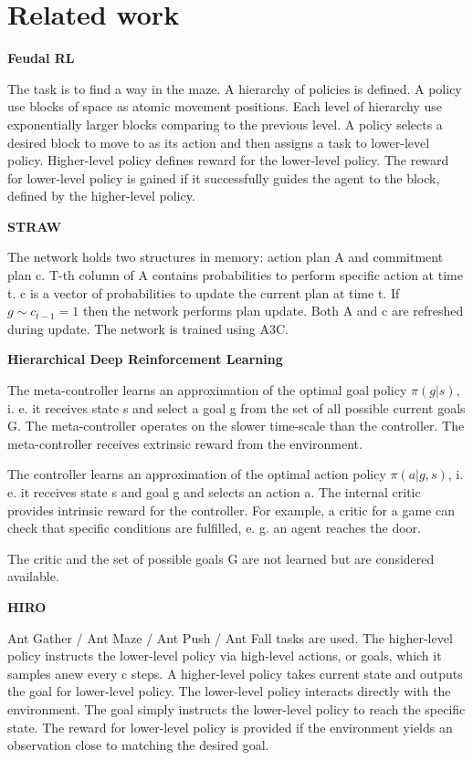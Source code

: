 \documentclass{article}
\begin{document}
\section{Related work}

\textbf{Feudal RL}~\citep{Dayan1992FeudalRL}

The task is to find a way in the maze. A hierarchy of policies is defined. A policy use blocks of space as atomic movement positions. Each level of hierarchy use exponentially larger blocks comparing to the previous level. A policy selects a desired block to move to as its action and then assigns a task to lower-level policy. Higher-level policy defines reward for the lower-level policy. The reward for lower-level policy is gained if it successfully guides the agent to the block, defined by the higher-level policy.

\textbf{STRAW}~\citep{Vezhnevets2016StrategicAW}

The network holds two structures in memory: action plan A and commitment plan c. T-th column of A contains probabilities to perform specific action at time t. c is a vector of probabilities to update the current plan at time t. If $g \sim c_{t-1} = 1$ then the network performs plan update. Both A and c are refreshed during update. The network is trained using A3C.

\textbf{Hierarchical Deep Reinforcement Learning}~\citep{Kulkarni2016HierarchicalDR}

The meta-controller learns an approximation of the optimal goal policy $\pi(g|s)$, i. e. it receives state s and select a goal g from the set of all possible current goals G. The meta-controller operates on the slower time-scale than the controller. The meta-controller receives extrinsic reward from the environment.

The controller learns an approximation of the optimal action policy $\pi(a|g,s)$, i. e. it receives state s and goal g and selects an action a. The internal critic provides intrinsic reward for the controller. For example, a critic for a game can check that specific conditions are fulfilled, e. g. an agent reaches the door.

The critic and the set of possible goals G are not learned but are considered available.

\textbf{HIRO}~\citep{Nachum2018DataEfficientHR}

Ant Gather / Ant Maze / Ant Push / Ant Fall tasks are used. The higher-level policy instructs the lower-level policy via high-level actions, or goals, which it samples anew every c steps. A higher-level policy takes current state and outputs the goal for lower-level policy. The lower-level policy interacts directly with the environment. The goal simply instructs the lower-level policy to reach the specific state. The reward for lower-level policy is provided if the environment yields an observation close to matching the desired goal.
\end{document}
